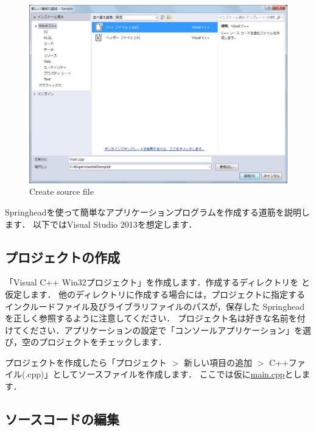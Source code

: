 \begin{figure}[t]
\begin{center}
\includegraphics[width=.6\hsize]{fig/newproject3.eps}
\end{center}
\caption{Create source file}
\label{fig_newproject3}
\end{figure}

Springheadを使って簡単なアプリケーションプログラムを作成する道筋を説明します．
\KLUDGE 以下ではVisual Studio 2013を想定します．

\subsection*{プロジェクトの作成}

\KLUDGE 「Visual C++ Win32プロジェクト」を作成します．作成するディレクトリを  と仮定します． 他のディレクトリに作成する場合には，プロジェクトに指定するインクルードファイル及びライブラリファイルのパスが，保存した Springhead を正しく参照するように注意してください． プロジェクト名は好きな名前を付けてください．アプリケーションの設定で「コンソールアプリケーション」を選び，空のプロジェクトをチェックします．

\KLUDGE プロジェクトを作成したら「プロジェクト $>$ 新しい項目の追加 $>$ C++ファイル(.cpp)」としてソースファイルを作成します．
\KLUDGE ここでは仮に\url{main.cpp}とします．

\subsection*{ソースコードの編集}

